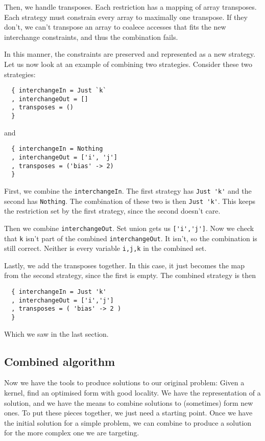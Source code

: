\documentclass{article}
\begin{document}
Then, we handle transposes. Each restriction has a mapping of array transposes.  Each strategy must constrain every array to maximally one transpose. If they
don't, we can't transpose an array to coalece accesses that fits the new interchange constraints, and thus the combination fails.

In this manner, the constraints are preserved and represented as a new strategy.\\

Let us now look at an example of combining two strategies. Consider these two strategies:
\begin{verbatim}
  { interchangeIn = Just `k`
  , interchangeOut = []
  , transposes = ()
  }
\end{verbatim}
and

\begin{verbatim}
  { interchangeIn = Nothing
  , interchangeOut = ['i', 'j']
  , transposes = ('bias' -> 2)
  }
\end{verbatim}

First, we combine the \verb`interchangeIn`. The first strategy has \verb`Just 'k'` and the second has \verb`Nothing`. The combination of these two is then
\verb`Just 'k'`. This keeps the restriction set by the first strategy, since the second doesn't care.

Then we combine \verb`interchangeOut`. Set union gets us \verb`['i','j']`. Now we check that \verb`k` isn't part of the combined \verb`interchangeOut`. It
isn't, so the combination is still correct. Neither is every variable \verb`i,j,k` in the combined set.

Lastly, we add the transposes together. In this case, it just becomes the map from the second strategy, since the first is empty. The combined strategy is then
\begin{verbatim}
  { interchangeIn = Just 'k'
  , interchangeOut = ['i','j']
  , transposes = ( 'bias' -> 2 )
  }
\end{verbatim}
Which we saw in the last section.

\subsection{Combined algorithm}

Now we have the tools to produce solutions to our original problem: Given a kernel, find an optimised form with good locality. We have the representation of a
solution, and we have the means to combine solutions to (sometimes) form new ones. To put these pieces together, we just need a starting point. Once we have the
initial solution for a simple problem, we can combine to produce a solution for the more complex one we are targeting.
\end{document}
